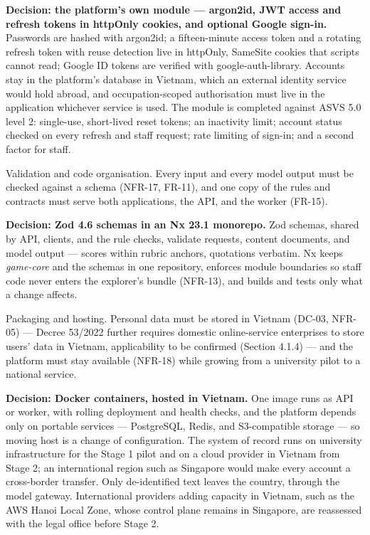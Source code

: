 \textbf{Decision: the platform's own module --- argon2id, JWT access and refresh tokens in httpOnly cookies, and optional Google sign-in.} Passwords are hashed with argon2id\cite{r157}; a fifteen-minute access token and a rotating refresh token with reuse detection\cite{r158} live in httpOnly, SameSite cookies that scripts cannot read; Google ID tokens are verified with google-auth-library. Accounts stay in the platform's database in Vietnam, which an external identity service would hold abroad, and occupation-scoped authorisation must live in the application whichever service is used. The module is completed against ASVS 5.0 level 2\cite{r159}: single-use, short-lived reset tokens; an inactivity limit; account status checked on every refresh and staff request; rate limiting of sign-in; and a second factor for staff.

Validation and code organisation. Every input and every model output must be checked against a schema (NFR-17, FR-11), and one copy of the rules and contracts must serve both applications, the API, and the worker (FR-15).

\textbf{Decision: Zod 4.6 schemas in an Nx 23.1 monorepo.} Zod schemas, shared by API, clients, and the rule checks, validate requests, content documents, and model output --- scores within rubric anchors, quotations verbatim. Nx keeps \textit{game-core} and the schemas in one repository, enforces module boundaries so staff code never enters the explorer's bundle (NFR-13), and builds and tests only what a change affects\cite{r160}.

Packaging and hosting. Personal data must be stored in Vietnam (DC-03, NFR-05) --- Decree 53/2022 further requires domestic online-service enterprises to store users' data in Vietnam, applicability to be confirmed (Section 4.1.4)\cite{r161,r162} --- and the platform must stay available (NFR-18) while growing from a university pilot to a national service.

\textbf{Decision: Docker containers, hosted in Vietnam.} One image runs as API or worker, with rolling deployment and health checks, and the platform depends only on portable services --- PostgreSQL, Redis, and S3-compatible storage --- so moving host is a change of configuration. The system of record runs on university infrastructure for the Stage 1 pilot and on a cloud provider in Vietnam from Stage 2\cite{r163}; an international region such as Singapore would make every account a cross-border transfer\cite{r99}. Only de-identified text leaves the country, through the model gateway. International providers adding capacity in Vietnam, such as the AWS Hanoi Local Zone, whose control plane remains in Singapore\cite{r164}, are reassessed with the legal office before Stage 2.

